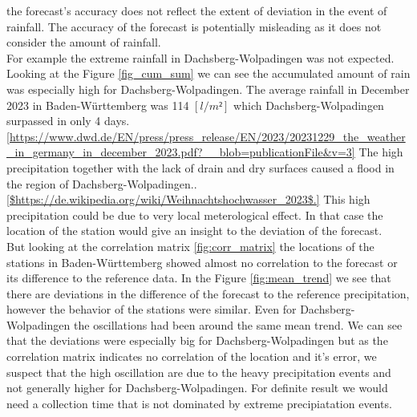 \documentclass{article}
\theoremstyle{plain}
\theoremstyle{definition}
\theoremstyle{remark}
\begin{document}
the forecast's accuracy does not reflect the extent of deviation in the event
of rainfall. The accuracy of the forecast is potentially misleading as it does
not consider the amount of rainfall. \\
For example the extreme rainfall in Dachsberg-Wolpadingen was not expected.
Looking at the Figure \ref{fig_cum_sum} we can see the accumulated amount of
rain was especially high for Dachsberg-Wolpadingen. The average rainfall in
December 2023 in Baden-Württemberg was 114 $[l/m²]$ which Dachsberg-Wolpadingen
surpassed in only 4
days.\ref{https://www.dwd.de/EN/press/press_release/EN/2023/20231229_the_weather_in_germany_in_december_2023.pdf?__blob=publicationFile&v=3}
The high precipitation together with the lack of drain and dry surfaces caused
a flood in the region of
Dachsberg-Wolpadingen..\ref{$https://de.wikipedia.org/wiki/Weihnachtshochwasser_2023$.}
This high precipitation could be due to very local meterological effect. In
that case the location of the station would give an insight to the deviation of
the forecast.\\

But looking at the correlation matrix \ref{fig:corr_matrix} the locations of
the stations in Baden-Württemberg showed almost no correlation to the forecast
or its difference to the reference data.
In the Figure \ref{fig:mean_trend} we see that there are deviations in the
difference of the forecast to the reference precipitation, however the behavior
of the stations were similar.
Even for Dachsberg-Wolpadingen the oscillations had been around the same mean
trend.	%
We can see that the deviations were especially big for Dachsberg-Wolpadingen
but as the correlation matrix indicates no correlation of the location and it's
error, we suspect that the high oscillation are due to the heavy precipitation
events and not generally higher for Dachsberg-Wolpadingen. For definite result
we would need a collection time that is not dominated by extreme precipiatation
events.\\  %
\end{document}
